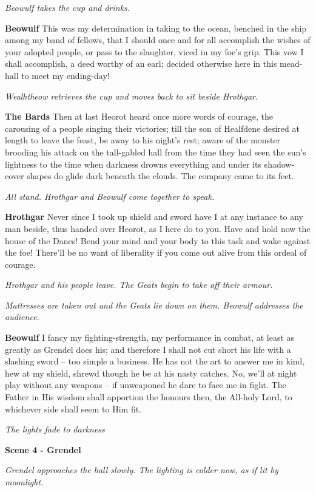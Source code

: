 \documentclass[a4paper]{article}
\begin{document}
{\centerline{\textit{Beowulf takes the cup and drinks.}}

\textbf{Beowulf} This was my determination in taking to the ocean,
benched in the ship among my band of fellows,
that I should once and for all accomplish the wishes
of your adopted people, or pass to the slaughter,
viced in my foe's grip. This vow I shall accomplish,
a deed worthy of an earl; decided otherwise
here in this mead-hall to meet my ending-day!

\centerline{\textit{Wealhtheow retrieves the cup and moves back to sit beside Hrothgar.}}

\textbf{The Bards} Then at last Heorot heard once more
words of courage, the carousing of a people
singing their victories; till the son of Healfdene
desired at length to leave the feast,
be away to his night's rest; aware of the monster
brooding his attack on the tall-gabled hall
from the time they had seen the sun's lightness
to the time when darkness drowns everything
and under its shadow-cover shapes do glide
dark beneath the clouds. 
The company came to its feet.

\centerline{\textit{All stand. Hrothgar and Beowulf come together to speak.}}

\textbf{Hrothgar} Never since I took up shield and sword
have I at any instance to any man beside,
thus handed over Heorot, as I here do to you.
Have and hold now the house of the Danes!
Bend your mind and your body to this task
and wake against the foe! There'll be no want of liberality
if you come out alive from this ordeal of courage.

\newpage
\centerline{\textit{Hrothgar and his people leave. The Geats begin to take off their armour.}}
\centerline{\textit{Mattresses are taken out and the Geats lie down on them. Beowulf addresses the audience.}}

\textbf{Beowulf} I fancy my fighting-strength, my performance in combat,
at least as greatly as Grendel does his;
and therefore I shall not cut short his life
with a slashing sword – too simple a business.
He has not the art to answer me in kind,
hew at my shield, shrewd though he be
at his nasty catches. No, we'll at night play
without any weapons – if unweaponed he dare
to face me in fight. The Father in His wisdom
shall apportion the honours then, the All-holy Lord,
to whichever side shall seem to Him fit.

\centerline{\textit{The lights fade to darkness}}

\newpage
\centerline{\textbf{Scene 4 - Grendel}}
\centerline{\textit{Grendel approaches the hall slowly. The lighting is colder now, as if lit by moonlight.}}

}
\end{document}
